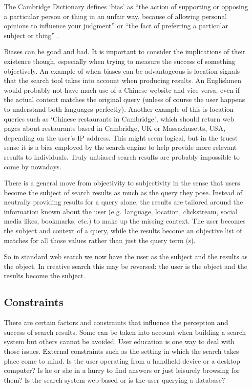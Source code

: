 The Cambridge Dictionary defines `bias' as ``the action of supporting or opposing a particular person or thing in an unfair way, because of allowing personal opinions to influence your judgment'' or ``the fact of preferring a particular subject or thing'' \autocite*{CamDict}.

Biases can be good and bad. It is important to consider the implications of their existence though, especially when trying to measure the success of something objectively. An example of when biases can be advantageous is location signals that the search tool takes into account when producing results. An Englishmen would probably not have much use of a Chinese website and vice-versa, even if the actual content matches the original query (unless of course the user happens to understand both languages perfectly). Another example of this is location queries such as `Chinese restaurants in Cambridge', which should return web pages about restaurants based in Cambridge, UK or Massachusetts, USA, depending on the user's IP address.  This might seem logical, but in the truest sense it is a bias employed by the search engine to help provide more relevant results to individuals. Truly unbiased search results are probably impossible to come by nowadays.

There is a general move from objectivity to subjectivity in the sense that users become the subject of search results as much as the query they pose. Instead of neutrally providing results for a query alone, the results are tailored around the information known about the user (e.g.\ language, location, clickstream, social media likes, bookmarks, etc.) to make up the missing context. The user becomes the subject and context of a query, while the results become an objective list of matches for all those values rather than just the query term (s).

So in standard web search we now have the user as the subject and the results as the object. In creative search this may be reversed: the user is the object and the results become the subject.


\subsection{Constraints}

There are certain factors and constraints that influence the perception and success of search results. Some can be taken into account when building a search system but others cannot be avoided. User education is one way to deal with those issues. External constraints such as the setting in which the search takes place come to mind. Is the user operating from a handheld device or a desktop computer? Is he or she in a hurry to find answers or just leisurely browsing for them? Is the search system web-based or is the user querying a database?

